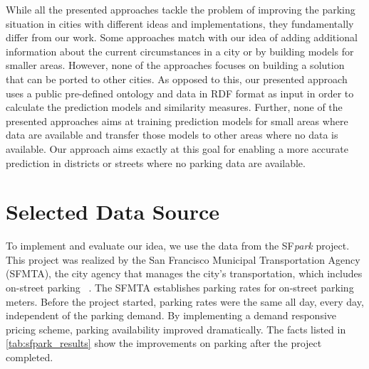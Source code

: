 While all the presented approaches tackle the problem of improving the parking situation in cities with different ideas and implementations, they fundamentally differ from our work. 
Some approaches match with our idea of adding additional information about the current circumstances in a city or by building models for smaller areas.
However, none of the approaches focuses on building a solution that can be ported to other cities. 
As opposed to this, our presented approach uses a public pre-defined ontology and data in RDF format as input in order to calculate the prediction models and similarity measures. 
Further, none of the presented approaches aims at training prediction models for small areas where data are available and transfer those models to other areas where no data is available. Our approach aims exactly at this goal for enabling a more accurate prediction in districts or streets where no parking data are available. 

\section{Selected Data Source}
To implement and evaluate our idea, we use the data from the SF\textit{park} project. This project was realized by the San Francisco Municipal Transportation Agency (SFMTA), the city agency that manages the city's transportation, which includes on-street parking~\cite{sfpark} \cite{sfpark_evaluation}. The SFMTA establishes parking rates for on-street parking meters. Before the project started, parking rates were the same all day, every day, independent of the parking demand. By implementing a demand responsive pricing scheme, parking availability improved dramatically. 
The facts listed in \ref{tab:sfpark_results} show the improvements on parking after the project completed.

